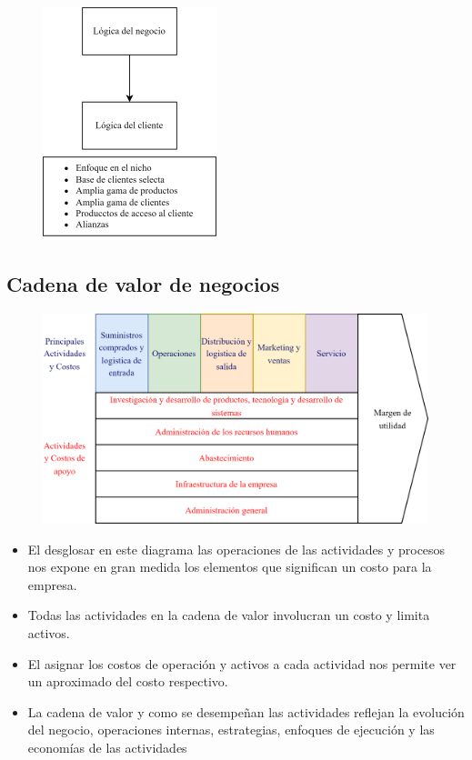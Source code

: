\documentclass{templateNote}
\begin{document}
\begin{figure}[H]
    \centering
    \includegraphics[width=0.45\textwidth]{img/logicacliente.png}
\end{figure}

\subsection{Cadena de valor de negocios}
\begin{figure}[H]
    \centering
    \includegraphics[width=1\textwidth]{img/costosdenoseque.png}
\end{figure}

\begin{itemize}
    \item El desglosar en este diagrama las operaciones de las actividades y procesos nos expone en gran medida los elementos que significan un costo para la empresa.
    \item Todas las actividades en la cadena de valor involucran un costo y limita activos.
    \item El asignar los costos de operación y activos a cada actividad nos permite ver un aproximado del costo respectivo.
    \item La cadena de valor y como se desempeñan las actividades reflejan la evolución del negocio, operaciones internas, estrategias, enfoques de ejecución y las economías de las actividades
\end{itemize}
\end{document}
